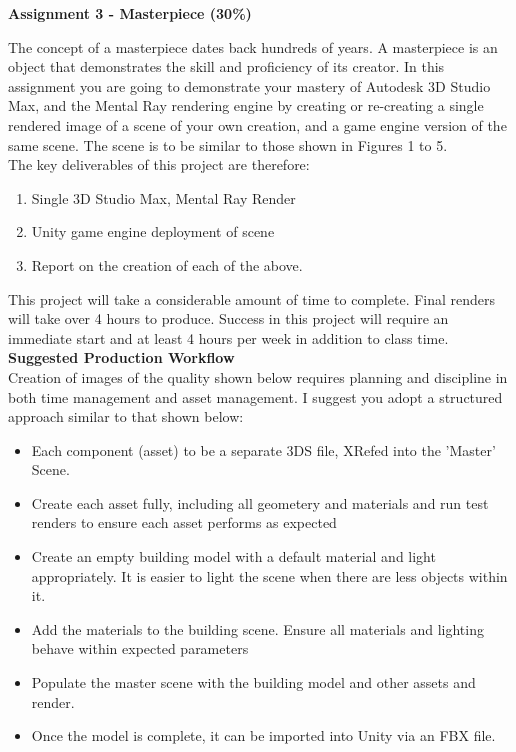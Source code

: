 
	
\begin{flushleft}
\Large\textbf{Assignment 3 - Masterpiece (30\%)}\\
\end{flushleft}

The concept of a masterpiece dates back hundreds of years.  A masterpiece is an object that demonstrates the skill and proficiency of its creator.  In this assignment you are going to demonstrate your mastery of Autodesk 3D Studio Max, and the Mental Ray rendering engine by creating or re-creating a single rendered image of a scene of your own creation, and a game engine version of the same scene. The scene is to be similar to those shown in Figures 1 to 5.\\

The key deliverables of this project are therefore:

\begin{enumerate}
	\item Single 3D Studio Max, Mental Ray Render
	\item Unity game engine deployment of scene
	\item Report on the creation of each of the above.
\end{enumerate}

This project will take a considerable amount of time to complete.  Final renders will take over 4 hours to produce.  Success in this project will require an immediate start and at least 4 hours per week in addition to class time.  \\

\textbf{Suggested Production Workflow}\\
Creation of images of the quality shown below requires planning and discipline in both time management and asset management.  I suggest you adopt a structured approach similar to that shown below:

\begin{itemize}
	\item Each component (asset) to be a separate 3DS file, XRefed into the 'Master' Scene.
	\item Create each asset fully, including all geometery and materials and run test renders to ensure each asset performs as expected
	\item Create an empty building model with a default material and light appropriately.  It is easier to light the scene when there are less objects within it.  
	\item Add the materials to the building scene.  Ensure all materials and lighting behave within expected parameters
	\item Populate the master scene with the building model and other assets and render.
	\item Once the model is complete, it can be imported into Unity via an FBX file.
\end{itemize}


